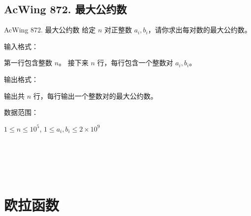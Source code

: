 \subsection{AcWing 872. 最大公约数}
\begin{titledbox}{AcWing 872. 最大公约数}
    给定 $n$ 对正整数 $a_i, b_i$，请你求出每对数的最大公约数。

    输入格式：

    第一行包含整数 $n$。 接下来 $n$ 行，每行包含一个整数对 $a_i,b_i$。

    输出格式：

    输出共 $n$ 行，每行输出一个整数对的最大公约数。

    数据范围：

    $1 \le n \le 10^5$, $1 \le a_i, b_i \le 2 \times 10^9$

    \begin{inputblock}
         \\
         \\
    \end{inputblock}
    \begin{outputblock}
         \\
    \end{outputblock}
\end{titledbox}


\section{欧拉函数}

